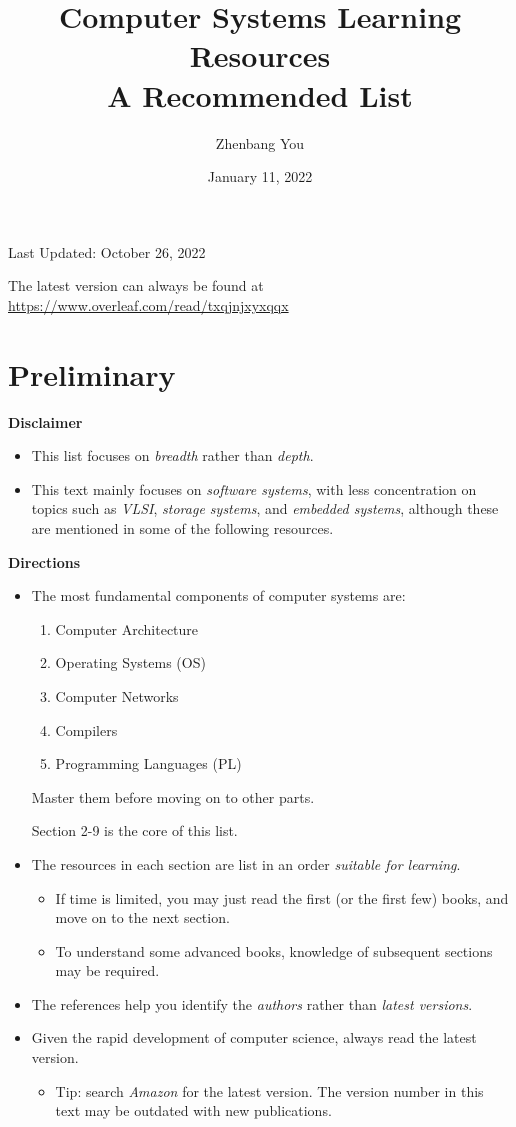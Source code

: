\documentclass{article}
\title{\Huge{Computer Systems Learning Resources}\\ \huge{A Recommended List}}
\author{Zhenbang You}
\date{January 11, 2022}
\begin{document}
\maketitle

\centerline{\large{Last Updated: October 26, 2022}}

\vspace{20pt}

The latest version can always be found at \href{https://www.overleaf.com/read/txqjnjxyxqqx}{https://www.overleaf.com/read/txqjnjxyxqqx}

\section{Preliminary}

\textbf{Disclaimer}
\begin{itemize}
    \item This list focuses on \emph{breadth} rather than \emph{depth}.
    \item This text mainly focuses on \emph{software systems}, with less concentration on topics such as \emph{VLSI}, \emph{storage systems}, and \emph{embedded systems}, although these are mentioned in some of the following resources.
\end{itemize}

\noindent
\textbf{Directions}
\begin{itemize}
    \item The most fundamental components of computer systems are:
    \begin{enumerate}
        \item Computer Architecture
        \item Operating Systems (OS)
        \item Computer Networks
        \item Compilers
        \item Programming Languages (PL)
    \end{enumerate}
    Master them before moving on to other parts.
    
    Section 2-9 is the core of this list.
    \item The resources in each section are list in an order \emph{suitable for learning}.
    \begin{itemize}
        \item If time is limited, you may just read the first (or the first few) books, and move on to the next section.
        \item To understand some advanced books, knowledge of subsequent sections may be required.
    \end{itemize}
    \item The references help you identify the \emph{authors} rather than \emph{latest versions}.
    \item Given the rapid development of computer science, always read the latest version.
    \begin{itemize}
        \item Tip: search \emph{Amazon} for the latest version. The version number in this text may be outdated with new publications.
    \end{itemize}
\end{itemize}
\end{document}
